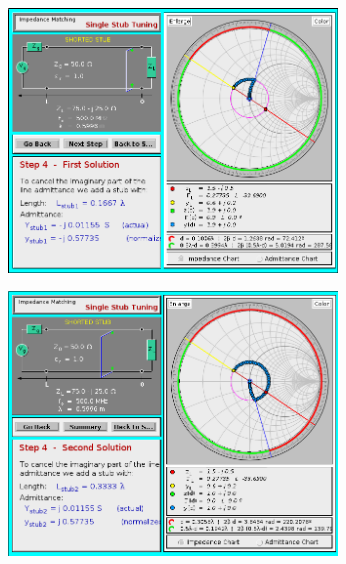 \documentclass[11pt;a4paper;fleqn]{report}
\begin{document}
   \begin{center}
    \includegraphics[height=7cm]{images/s1}

    \includegraphics[height=7cm]{images/s2}
   \end{center}
\end{document}
